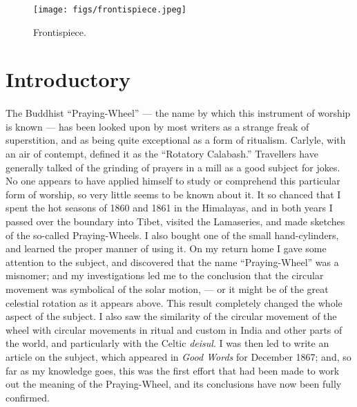 \documentclass[a4paper, 11pt, oneside, polutonikogreek, english]{article}
\begin{document}
\bigskip
\centerline{\EightStarTaper}
\centerline{\EightStarTaper\EightStarTaper}
\bigskip
\vspace*{\fill}
\clearpage
\vspace*{\fill}
\begin{figure}[H]
\centering
\texttt{[image: figs/frontispiece.jpeg]}
\caption{Frontispiece.}
\end{figure}
\vspace*{\fill}
\clearpage
\section*{Introductory}
\paragraph{}
The Buddhist ``Praying-Wheel'' --- the name by which this instrument of worship is known --- has been looked upon by most writers as a strange freak of superstition, and as being quite exceptional as a form of ritualism. Carlyle, with an air of contempt, defined it as the ``Rotatory Calabash.'' Travellers have generally talked of the grinding of prayers in a mill as a good subject for jokes. No one appears to have applied himself to study or comprehend this particular form of worship, so very little seems to be known about it. It so chanced that I spent the hot seasons of 1860 and 1861 in the Himalayas, and in both years I passed over the boundary into Tibet, visited the Lamaseries, and made sketches of the so-called Praying-Wheels. I also bought one of the small hand-cylinders, and learned the proper manner of using it. On my return home I gave some attention to the subject, and discovered that the name ``Praying-Wheel'' was a misnomer; and my investigations led me to the conclusion that the circular movement was symbolical of the solar motion, --- or it might be of the great celestial rotation as it appears above. This result completely changed the whole aspect of the subject. I also saw the similarity of the circular movement of the wheel with circular movements in ritual and custom in India and other parts of the world, and particularly with the Celtic \emph{deisul}. I was then led to write an article on the subject, which appeared in \emph{Good Words} for December 1867; and, so far as my knowledge goes, this was the first effort that had been made to work out the meaning of the Praying-Wheel, and its conclusions have now been fully confirmed.
\end{document}

